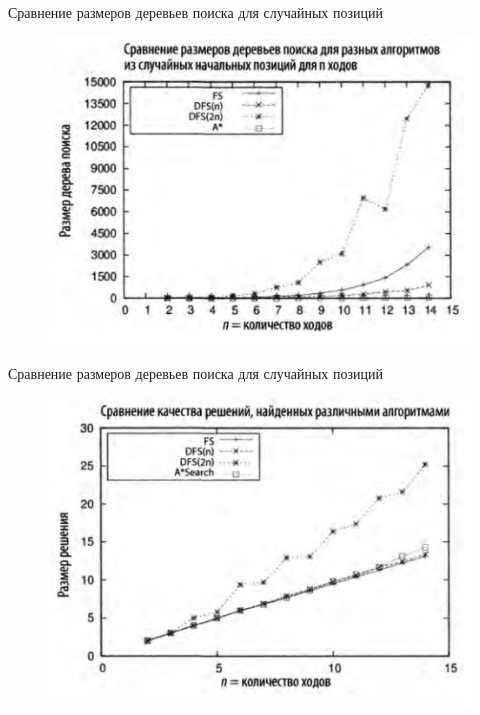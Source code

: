 \documentclass{beamer}
\begin{document}
\begin{frame}{Сравнение размеров деревьев поиска для случайных позиций}
\begin{figure}[h]
\centering
\includegraphics[scale=0.75]{images/lec06-pic18.png}
\end{figure}
\end{frame}

\begin{frame}{Сравнение размеров деревьев поиска для случайных позиций}
\begin{figure}[h]
\centering
\includegraphics[scale=0.75]{images/lec06-pic19.png}
\end{figure}
\end{frame}
\end{document}
